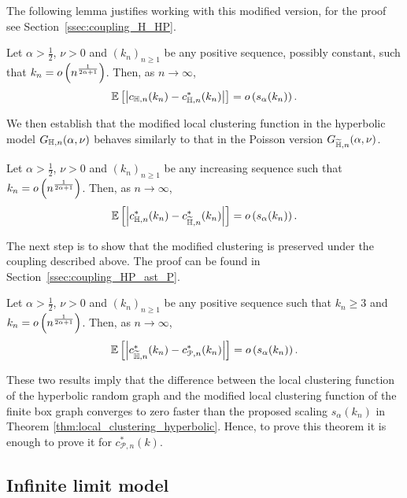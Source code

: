 The following lemma justifies working with this modified version, for the proof see Section~\ref{ssec:coupling_H_HP}.

\begin{lemma}\label{lem:clustering_ast_H}
Let $\alpha > \frac{1}{2}$, $\nu > 0$ and $(k_n)_{n\ge 1}$ be any positive sequence, possibly constant, such that $k_n = o\left(n^{\frac{1}{2\alpha + 1}}\right)$. Then, as $n \to \infty$,
\[
	\mathbb{E}\left[\left|c_{\mathbb{H},n}(k_n) - c_{\mathbb{H},n}^\ast(k_n)\right|\right] = o\left(s_\alpha(k_n)\right).
\]
\end{lemma}

We then establish that the modified local clustering function in the hyperbolic model $G_{\mathbb{H},n}(\alpha,\nu)$ behaves similarly to that in the Poisson version $G_{\widetilde{\mathbb{H}}, n}(\alpha,\nu)$.

\begin{proposition}\label{prop:clustering_ast_H_Pois}
Let $\alpha > \frac{1}{2}$, $\nu > 0$ and $(k_n)_{n\ge 1}$ be any increasing sequence such that $k_n = o\left(n^{\frac{1}{2\alpha + 1}}\right)$. Then, as $n \to \infty$,
\[
	\mathbb{E}\left[\left|c_{\mathbb{H},n}^\ast(k_n) - c_{\widetilde{\mathbb{H}},n}^\ast(k_n)\right|\right] = o\left(s_\alpha(k_n)\right).
\]
\end{proposition}

The next step is to show that the modified clustering is preserved under the coupling described above. The proof can be found in Section~\ref{ssec:coupling_HP_ast_P}.

\begin{proposition}\label{prop:couling_c_H_P}
Let $\alpha > \frac{1}{2}$, $\nu > 0$ and $(k_n)_{n\ge 1}$ be any positive sequence such that $k_n \ge 3$ and $k_n = o\left(n^{\frac{1}{2\alpha + 1}}\right)$. Then, as $n \to \infty$,
\[
	\mathbb{E}\left[\left|c_{\widetilde{\mathbb{H}},n}^\ast(k_n) - c_{{\mathcal P},n}^\ast(k_n)\right|\right] = o\left(s_\alpha(k_n)\right).
\]
\end{proposition}

These two results imply that the difference between the local clustering function of the hyperbolic random graph and the modified local clustering function of the finite box graph converges to zero faster than the proposed scaling $s_\alpha(k_n)$ in Theorem \ref{thm:local_clustering_hyperbolic}. Hence, to prove this theorem it is enough to prove it for $c_{\mathcal{P},n}^\ast(k)$. 

\subsection{Infinite limit model}\label{ssec:infinite_model}

